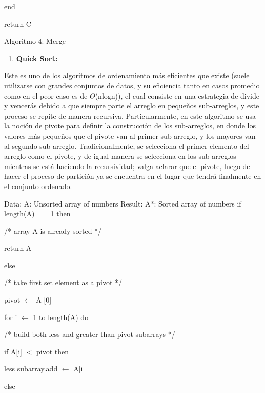 ﻿\documentclass{article} %
\begin{document}
\noindent end

\noindent return C

\noindent Algoritmo 4: Merge

\noindent 

\noindent \textbf{}

\begin{enumerate}
\item \textbf{ Quick Sort:}
\end{enumerate}

\noindent \textbf{}

\noindent Este es uno de los algoritmos de ordenamiento m\'{a}s eficientes que existe (suele utilizarse con grandes conjuntos de datos, y su eficiencia tanto en casos promedio como en el peor caso es de $\Theta$(nlogn)), el cual consiste en una estrategia de divide y vencer\'{a}s debido a que siempre parte el arreglo en peque\~{n}os sub-arreglos, y este proceso se repite de manera recursiva.   Particularmente, en este algoritmo se usa la noci\'{o}n de pivote para definir la construcci\'{o}n de los sub-arreglos, en donde los valores m\'{a}s peque\~{n}os que el pivote van al primer sub-arreglo, y los mayores van al segundo sub-arreglo.   Tradicionalmente, se selecciona el primer elemento del arreglo como el pivote, y de igual manera se selecciona en los sub-arreglos mientras se est\'{a} haciendo la recursividad; valga aclarar que el pivote, luego de hacer el proceso de partici\'{o}n ya se encuentra en el lugar que tendr\'{a} finalmente en el conjunto ordenado.

\noindent \textbf{}

\noindent Data: A: Unsorted array of numbers Result:  A*: Sorted array of numbers if length(A) == 1 then

\noindent /* array A is already sorted */

\noindent return A

\noindent else

\noindent /* take first set element as a pivot */

\noindent pivot $\mathrm{\leftarrow}$ A [0]

\noindent for i $\mathrm{\leftarrow}$ 1 to length(A) do

\noindent /* build both less and greater than pivot subarrays */

\noindent if A[i] $\mathrm{<}$ pivot then

\noindent less subarray.add $\mathrm{\leftarrow}$ A[i]

\noindent else
\end{document}
